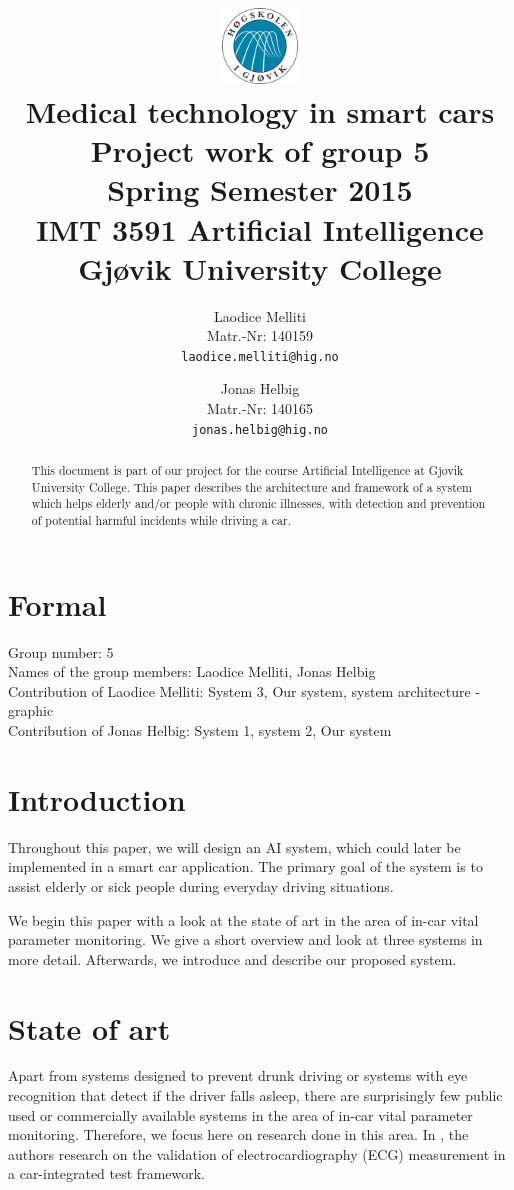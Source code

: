 \documentclass[a4paper]{article}		%
\title{									%
	\includegraphics[height=2cm]{images/higlogo}\\\vspace{1cm}	%
	Medical technology in smart cars\\\vspace{7mm}
	\Large{Project work of group 5}\\\vspace{5mm}			%
	\normalsize{Spring Semester 2015}\\\vspace{1cm}			
	\large{IMT 3591 Artificial Intelligence\\
		Gj\o{}vik University College
		\\\vspace{1cm}}}
\author{			%
Laodice Melliti\\
Matr.-Nr: 140159\\
{\tt laodice.melliti@hig.no}
\and 
Jonas Helbig\\
Matr.-Nr: 140165\\
{\tt jonas.helbig@hig.no}
\vspace{1cm}}
\begin{document}
	
\maketitle				%
\thispagestyle{empty} 	%
\begin{abstract}		%
	This document is part of our project for the course Artificial Intelligence at Gj\o{}vik University College. This paper describes the architecture and framework of a system which helps elderly and/or people with chronic illnesses, with detection and prevention of potential harmful incidents while driving a car. 
\end{abstract}

\newpage				%
\tableofcontents		%
\newpage
\section{Formal}
Group number: 5\\
Names of the group members: Laodice Melliti, Jonas Helbig\\
Contribution of Laodice Melliti: System 3, Our system, system architecture - graphic\\
Contribution of Jonas Helbig: System 1, system 2, Our system \\
\section{Introduction}
\indent					%
\indent Throughout this paper, we will design an AI system, which could later be implemented in a smart car application. The primary goal of the system is to assist elderly or sick people during everyday driving situations.

We begin this paper with a look at  the state of art in the area of in-car vital parameter monitoring. We give a short overview and look at three systems in more detail. Afterwards, we introduce and describe our proposed system.
\section{State of art}
\indent
\indent Apart from systems designed to prevent drunk driving or systems with eye recognition that detect if the driver falls asleep, there are surprisingly few public used or commercially available systems in the area of in-car vital parameter monitoring. Therefore, we focus here on research done in this area. In \cite{schneider:12}, the authors research on the validation of electrocardiography (ECG) measurement in a car-integrated test framework.
\end{document}
